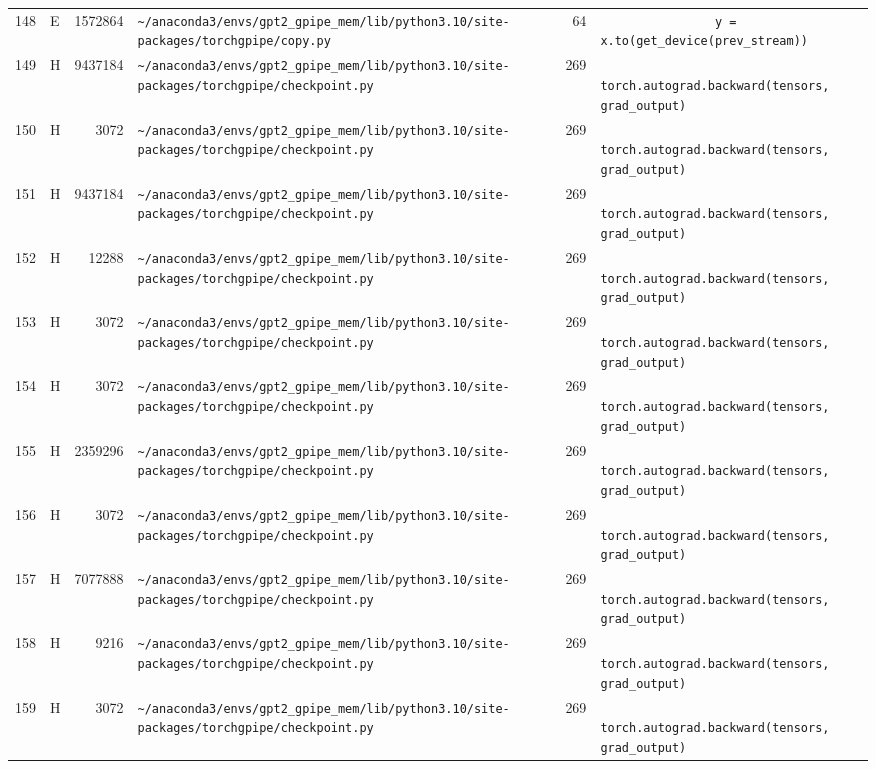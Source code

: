 \documentclass{article}
\begin{document}
\begin{longtable}{r l r p{6.5cm} r p{7.0cm}}
148 & E & 1572864 & \lstinline|~/anaconda3/envs/gpt2_gpipe_mem/lib/python3.10/site-packages/torchgpipe/copy.py| & 64 & \lstinline|                y = x.to(get_device(prev_stream))| \\
149 & H & 9437184 & \lstinline|~/anaconda3/envs/gpt2_gpipe_mem/lib/python3.10/site-packages/torchgpipe/checkpoint.py| & 269 & \lstinline|            torch.autograd.backward(tensors, grad_output)| \\
150 & H & 3072 & \lstinline|~/anaconda3/envs/gpt2_gpipe_mem/lib/python3.10/site-packages/torchgpipe/checkpoint.py| & 269 & \lstinline|            torch.autograd.backward(tensors, grad_output)| \\
151 & H & 9437184 & \lstinline|~/anaconda3/envs/gpt2_gpipe_mem/lib/python3.10/site-packages/torchgpipe/checkpoint.py| & 269 & \lstinline|            torch.autograd.backward(tensors, grad_output)| \\
152 & H & 12288 & \lstinline|~/anaconda3/envs/gpt2_gpipe_mem/lib/python3.10/site-packages/torchgpipe/checkpoint.py| & 269 & \lstinline|            torch.autograd.backward(tensors, grad_output)| \\
153 & H & 3072 & \lstinline|~/anaconda3/envs/gpt2_gpipe_mem/lib/python3.10/site-packages/torchgpipe/checkpoint.py| & 269 & \lstinline|            torch.autograd.backward(tensors, grad_output)| \\
154 & H & 3072 & \lstinline|~/anaconda3/envs/gpt2_gpipe_mem/lib/python3.10/site-packages/torchgpipe/checkpoint.py| & 269 & \lstinline|            torch.autograd.backward(tensors, grad_output)| \\
155 & H & 2359296 & \lstinline|~/anaconda3/envs/gpt2_gpipe_mem/lib/python3.10/site-packages/torchgpipe/checkpoint.py| & 269 & \lstinline|            torch.autograd.backward(tensors, grad_output)| \\
156 & H & 3072 & \lstinline|~/anaconda3/envs/gpt2_gpipe_mem/lib/python3.10/site-packages/torchgpipe/checkpoint.py| & 269 & \lstinline|            torch.autograd.backward(tensors, grad_output)| \\
157 & H & 7077888 & \lstinline|~/anaconda3/envs/gpt2_gpipe_mem/lib/python3.10/site-packages/torchgpipe/checkpoint.py| & 269 & \lstinline|            torch.autograd.backward(tensors, grad_output)| \\
158 & H & 9216 & \lstinline|~/anaconda3/envs/gpt2_gpipe_mem/lib/python3.10/site-packages/torchgpipe/checkpoint.py| & 269 & \lstinline|            torch.autograd.backward(tensors, grad_output)| \\
159 & H & 3072 & \lstinline|~/anaconda3/envs/gpt2_gpipe_mem/lib/python3.10/site-packages/torchgpipe/checkpoint.py| & 269 & \lstinline|            torch.autograd.backward(tensors, grad_output)| \\

\end{longtable}
\end{document}
